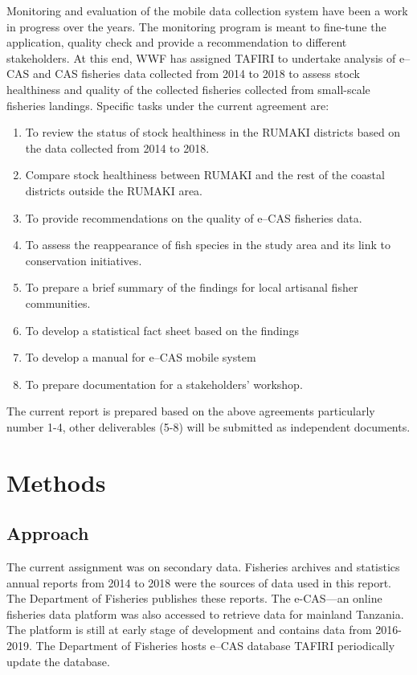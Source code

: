\documentclass[
  12pt,
  a4paper,
  oneside]{book}
\providecommand{\tightlist}{%
  \setlength{\itemsep}{0pt}\setlength{\parskip}{0pt}}
\begin{document}
Monitoring and evaluation of the mobile data collection system have been a work in progress over the years. The monitoring program is meant to fine-tune the application, quality check and provide a recommendation to different stakeholders. At this end, WWF has assigned TAFIRI to undertake analysis of e--CAS and CAS  fisheries data collected from 2014 to 2018 to assess stock healthiness and quality of the collected fisheries collected from small-scale fisheries landings. Specific tasks under the current agreement are:

\begin{enumerate}
\def\labelenumi{\arabic{enumi}.}
\tightlist
\item
  To review the status of stock healthiness in the RUMAKI districts based on the data collected from 2014 to 2018.
\item
  Compare stock healthiness between RUMAKI and the rest of the coastal districts outside the RUMAKI area.
\item
  To provide recommendations on the quality of e--CAS  fisheries data.
\item
  To assess the reappearance of fish species in the study area and its link to conservation initiatives.
\item
  To prepare a brief summary of the findings for local artisanal fisher communities.
\item
  To develop a statistical fact sheet based on the findings
\item
  To develop a manual for e--CAS mobile system
\item
  To prepare documentation for a stakeholders' workshop.
\end{enumerate}

The current report is prepared based on the above agreements particularly number 1-4, other deliverables (5-8) will be submitted as independent documents.

\hypertarget{method}{%
\chapter{Methods}\label{method}}

\hypertarget{approach}{%
\section{Approach}\label{approach}}

The current assignment was on secondary data. Fisheries archives and statistics annual reports from 2014 to 2018 were the sources of data used in this report. The Department of Fisheries  publishes these reports. The e-CAS---an online fisheries data platform was also accessed to retrieve data  for mainland Tanzania. The platform is still at early stage of development and contains data from 2016-2019. The Department of Fisheries hosts e--CAS database TAFIRI  periodically update the database.
\end{document}

